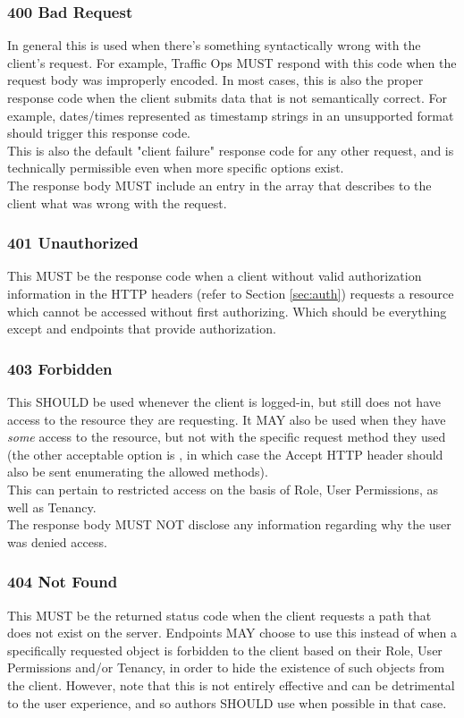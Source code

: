 \subsubsection{400 Bad Request\label{sec:400}}
In general this is used when there's something syntactically wrong with the client's request. For example, Traffic Ops MUST respond with this code
when the request body was improperly encoded. In most cases, this is also the proper response code when the client submits data that is not semantically
correct. For example, dates/times represented as timestamp strings in an unsupported format should trigger this response code.\\
This is also the default "client failure" response code for any other request, and is technically permissible even when more specific options exist.\\
The response body MUST include an entry in the  array that describes to the client what was wrong with the request.

\subsubsection{401 Unauthorized\label{sec:401}}
This MUST be the response code when a client without valid authorization information in the HTTP headers (refer to Section \ref{sec:auth}) requests a resource
which cannot be accessed without first authorizing. Which should be everything except  and endpoints that provide authorization.

\subsubsection{403 Forbidden\label{sec:403}}
This SHOULD be used whenever the client is logged-in, but still does not have access to the resource they are requesting. It MAY also be used when they
have \emph{some} access to the resource, but not with the specific request method they used (the other acceptable option is ,
in which case the Accept HTTP header should also be sent enumerating the allowed methods).\\
This can pertain to restricted access on the basis of Role, User Permissions, as well as Tenancy.\\
The response body MUST NOT disclose any information regarding why the user was
denied access.

\subsubsection{404 Not Found\label{sec:404}}
This MUST be the returned status code when the client requests a path that does
not exist on the server. Endpoints MAY choose to use this instead of
 when a specifically requested object is forbidden to the
client based on their Role, User Permissions and/or Tenancy, in order to hide
the existence of such objects from the client. However, note that this is not
entirely effective and can be detrimental to the user experience, and so
authors SHOULD use  when possible in that case.

